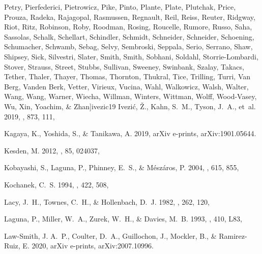 \documentclass[twocolumn]{aastex62}
\begin{document}
\begin{thebibliography}{}
{  {Petry}, {Pierfederici}, {Pietrowicz}, {Pike}, {Pinto}, {Plante}, {Plate},
  {Plutchak}, {Price}, {Prouza}, {Radeka}, {Rajagopal}, {Rasmussen},
  {Regnault}, {Reil}, {Reiss}, {Reuter}, {Ridgway}, {Riot}, {Ritz}, {Robinson},
  {Roby}, {Roodman}, {Rosing}, {Roucelle}, {Rumore}, {Russo}, {Saha},
  {Sassolas}, {Schalk}, {Schellart}, {Schindler}, {Schmidt}, {Schneider},
  {Schneider}, {Schoening}, {Schumacher}, {Schwamb}, {Sebag}, {Selvy},
  {Sembroski}, {Seppala}, {Serio}, {Serrano}, {Shaw}, {Shipsey}, {Sick},
  {Silvestri}, {Slater}, {Smith}, {Smith}, {Sobhani}, {Soldahl},
  {Storrie-Lombardi}, {Stover}, {Strauss}, {Street}, {Stubbs}, {Sullivan},
  {Sweeney}, {Swinbank}, {Szalay}, {Takacs}, {Tether}, {Thaler}, {Thayer},
  {Thomas}, {Thornton}, {Thukral}, {Tice}, {Trilling}, {Turri}, {Van Berg},
  {Vanden Berk}, {Vetter}, {Virieux}, {Vucina}, {Wahl}, {Walkowicz}, {Walsh},
  {Walter}, {Wang}, {Wang}, {Warner}, {Wiecha}, {Willman}, {Winters},
  {Wittman}, {Wolff}, {Wood-Vasey}, {Wu}, {Xin}, {Yoachim}, \&
  {Zhan}}]{ivezic19}
{Ivezi{\'c}}, {\v{Z}}., {Kahn}, S.~M., {Tyson}, J.~A., {et~al.} 2019, \apj,
  873, 111, 

{Kagaya}, K., {Yoshida}, S., \& {Tanikawa}, A. 2019, arXiv e-prints,
  arXiv:1901.05644.
\newblock {}

{Kesden}, M. 2012, \prd, 85, 024037, 

{Kobayashi}, S., {Laguna}, P., {Phinney}, E.~S., \& {M{\'e}sz{\'a}ros}, P.
  2004, \apj, 615, 855, 

{Kochanek}, C.~S. 1994, \apj, 422, 508, 

{Lacy}, J.~H., {Townes}, C.~H., \& {Hollenbach}, D.~J. 1982, \apj, 262, 120,

{Laguna}, P., {Miller}, W.~A., {Zurek}, W.~H., \& {Davies}, M.~B. 1993, \apjl,
  410, L83, 

{Law-Smith}, J. A.~P., {Coulter}, D.~A., {Guillochon}, J., {Mockler}, B., \&
  {Ramirez-Ruiz}, E. 2020, arXiv e-prints, arXiv:2007.10996.
\newblock {}


\end{thebibliography}
\end{document}
